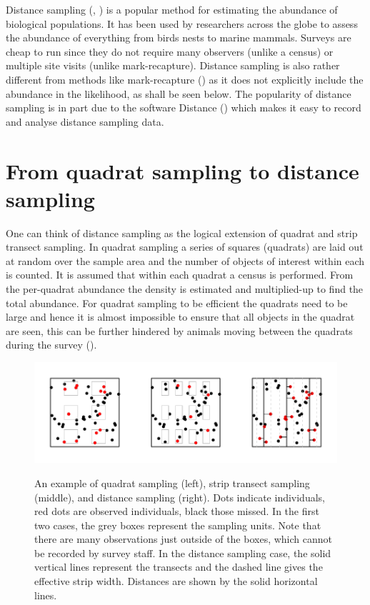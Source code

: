 \label{chap-intro-ds}

\label{intro-DS}

Distance sampling (\cite{IDS}, \cite{ADS}) is a popular method for estimating the abundance of biological populations. It has been used by researchers across the globe to assess the abundance of everything from birds nests to marine mammals. Surveys are cheap to run since they do not require many observers (unlike a census) or multiple site visits (unlike mark-recapture). Distance sampling is also rather different from methods like mark-recapture (\cite{ruthbook}) as it does not explicitly include the abundance in the likelihood, as shall be seen below. The popularity of distance sampling is in part due to the software Distance (\cite{distance-software}) which makes it easy to record and analyse distance sampling data. 

\section{From quadrat sampling to distance sampling}

One can think of distance sampling as the logical extension of quadrat and strip transect sampling. In quadrat sampling a series of squares (quadrats) are laid out at random over the sample area and the number of objects of interest within each is counted. It is assumed that within each quadrat a census is performed. From the per-quadrat abundance the density is estimated and multiplied-up to find the total abundance. For quadrat sampling to be efficient the quadrats need to be large and hence it is almost impossible to ensure that all objects in the quadrat are seen, this can be further hindered by animals moving between the quadrats during the survey (\cite[p. 2]{IDS}).

\begin{figure}
\centering
\includegraphics{intro/figs/quadrat-to-ds.pdf}\\
\caption{An example of quadrat sampling (left), strip transect sampling (middle), and distance sampling (right). Dots indicate individuals, red dots are observed individuals, black those missed. In the first two cases, the grey boxes represent the sampling units. Note that there are many observations just outside of the boxes, which cannot be recorded by survey staff. In the distance sampling case, the solid vertical lines represent the transects and the dashed line gives the effective strip width. Distances are shown by the solid horizontal lines.}
\label{quad-to-ds}
\end{figure}

